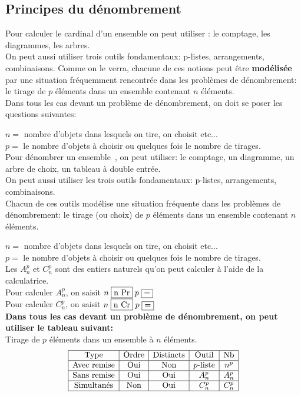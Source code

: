 \subsection{Principes du dénombrement}
Pour calculer le cardinal d'un ensemble on peut utiliser : le comptage, les diagrammes, les arbres.\\
On peut aussi utiliser trois outils fondamentaux:  p-listes,  arrangements,  combinaisons. Comme on le verra, chacune de ces notions peut être \textbf{modélisée} par une situation fréquemment rencontrée dans les problèmes de dénombrement: le tirage de $ p $ éléments dans un ensemble contenant  $ n $  éléments.\\ Dans tous les cas devant un problème de dénombrement, on doit se poser les questions suivantes:

 
  $ n= $ nombre d'objets dans lesquels on tire, on choisit etc...\\
  $ p= $  le nombre d'objets à choisir ou quelques fois le nombre de tirages.\\
  
Pour dénombrer un ensemble~, on peut utiliser: le comptage, un diagramme, un arbre de choix, un tableau à double entrée.\\
On peut aussi utiliser les trois outils fondamentaux:  p-listes,  arrangements,  combinaisons.\\ Chacun de ces outils  modélise  une situation fréquente  dans les problèmes de dénombrement: le tirage (ou choix) de $ p $ éléments dans un ensemble contenant  $ n $  éléments.

 
  $ n= $ nombre d'objets dans lesquels on tire, on choisit etc...\\
  $ p= $  le nombre d'objets à choisir ou quelques fois le nombre de tirages.\\
  
Les $A_{n}^{p} $ et  $C_{n}^{p} $ sont des entiers naturels qu'on peut calculer à l'aide de la calculatrice.\\
 Pour calculer $A_{n}^{p} $, on saisit $ n\; \fbox{n Pr}\; p\;\fbox{=}$\\
 Pour calculer $C_{n}^{p} $, on saisit  $ n\; \fbox{n Cr}\; p\;\fbox{=}$\\

 \textbf{Dans tous les cas devant un problème de dénombrement, on peut  utiliser le tableau suivant:}\\
 Tirage de $p$ éléments dans un ensemble à $n$ éléments.
$$
\begin{array}{|c|c|c|c|c|}
\hline
\text{Type} & \text{Ordre} & \text{Distincts} & \text{Outil} & \text{Nb} \\
\hline
\text{Avec remise} & \text{Oui} & \text{Non} & p\text{-liste} & n^p \\
\hline
\text{Sans remise} & \text{Oui} & \text{Oui} & A_n^p & A_n^p \\
\hline
\text{Simultanés} & \text{Non} & \text{Oui} & C_n^p & C_n^p \\
\hline
\end{array}
$$


